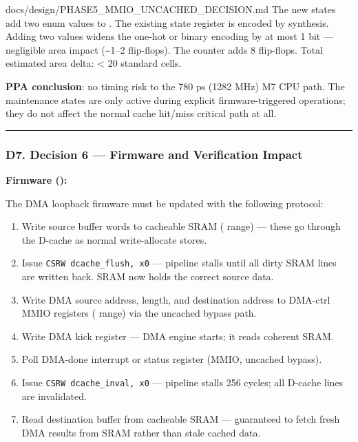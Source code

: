 \begin{relocated}{docs/design/PHASE5_MMIO_UNCACHED_DECISION.md}
The new states add two enum values to . The existing
state register is encoded by synthesis. Adding two values widens the
one-hot or binary encoding by at most 1 bit --- negligible area impact
(\textasciitilde1--2 flip-flops). The  counter adds 8
flip-flops. Total estimated area delta: \textless{} 20 standard cells.

\textbf{PPA conclusion}: no timing risk to the 780 ps (1282 MHz) M7 CPU
path. The maintenance states are only active during explicit
firmware-triggered operations; they do not affect the normal cache
hit/miss critical path at all.

\begin{center}\rule{0.5\linewidth}{0.5pt}\end{center}

\subsubsection{D7. Decision 6 --- Firmware and Verification Impact}\label{ds:dec:phase5-mmio-uncached:d7-decision-6-firmware-and-verification-impact}

\textbf{Firmware ():}

The DMA loopback firmware must be updated with the following protocol:

\begin{enumerate}
\def\labelenumi{\arabic{enumi}.}
\tightlist
\item
  Write source buffer words to cacheable SRAM ( range)
  --- these go through the D-cache as normal write-allocate stores.
\item
  Issue \texttt{CSRW\ dcache\_\allowbreak{}flush,\allowbreak{}\ x0} ---
  pipeline stalls until all dirty SRAM lines are written back. SRAM now
  holds the correct source data.
\item
  Write DMA source address, length, and destination address to DMA-ctrl
  MMIO registers ( range) via the uncached bypass
  path.
\item
  Write DMA kick register --- DMA engine starts; it reads coherent SRAM.
\item
  Poll DMA-done interrupt or status register (MMIO, uncached bypass).
\item
  Issue \texttt{CSRW\ dcache\_\allowbreak{}inval,\allowbreak{}\ x0} ---
  pipeline stalls 256 cycles; all D-cache lines are invalidated.
\item
  Read destination buffer from cacheable SRAM --- guaranteed to fetch
  fresh DMA results from SRAM rather than stale cached data.
\end{enumerate}


\end{relocated}
